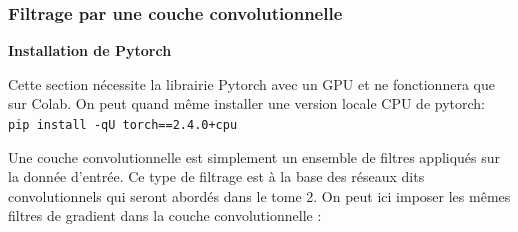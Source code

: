 \documentclass[
  11pt,
  letterpaper,
  open=any,
  twoside=false,
  french]{scrbook}
\begin{document}
\subsubsection{Filtrage par une couche
convolutionnelle}\label{filtrage-par-une-couche-convolutionnelle}

\textbf{Installation de Pytorch}

Cette section nécessite la librairie Pytorch avec un GPU et ne
fonctionnera que sur Colab. On peut quand même installer une version
locale CPU de pytorch: \texttt{pip\ install\ -qU\ torch==2.4.0+cpu}

Une couche convolutionnelle est simplement un ensemble de filtres
appliqués sur la donnée d'entrée. Ce type de filtrage est à la base des
réseaux dits convolutionnels qui seront abordés dans le tome 2. On peut
ici imposer les mêmes filtres de gradient dans la couche
convolutionnelle :
\end{document}

